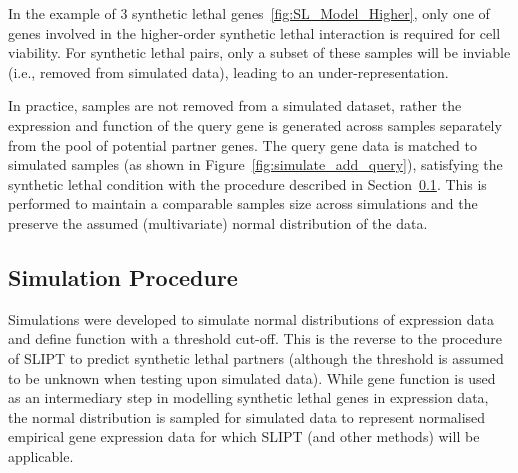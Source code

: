 In the example of 3 synthetic lethal genes~\ref{fig:SL_Model_Higher}, only one of genes involved in the higher-order synthetic lethal interaction is required for cell viability. For synthetic lethal pairs, only a subset of these samples will be inviable (i.e., removed from simulated data), leading to an under-representation.

In practice, samples are not removed from a simulated dataset, rather the expression and function of the query gene is generated across samples separately from the pool of potential partner genes. The query gene data is matched to simulated samples (as shown in Figure~\ref{fig:simulate_add_query}), satisfying the synthetic lethal condition with the procedure described in Section~\ref{methods:simulating_SL}. This is performed to maintain a comparable samples size across simulations and the preserve the assumed (multivariate) normal distribution of the data. 

\FloatBarrier

\subsection{Simulation Procedure} \label{methods:simulating_SL}

Simulations were developed to simulate normal distributions of expression data and define function with a threshold cut-off. This is the reverse to the procedure of \gls{SLIPT} to predict synthetic lethal partners (although the threshold is assumed to be unknown when testing upon simulated data). While gene function is used as an intermediary step in modelling synthetic lethal genes in expression data, the normal distribution is sampled for simulated data to represent normalised empirical gene expression data for which \gls{SLIPT} (and other methods) will be applicable.

